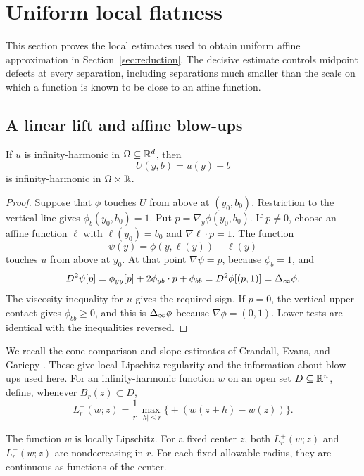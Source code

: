 \section{Uniform local flatness}\label{sec:flatness}

This section proves the local estimates used to obtain uniform affine approximation in Section~\ref{sec:reduction}. The decisive estimate controls midpoint defects at every separation, including separations much smaller than the scale on which a function is known to be close to an affine function.

\subsection{A linear lift and affine blow-ups}

\begin{lemma}\label{lem:linear-lift}
If $u$ is infinity-harmonic in $\Omega\subseteq\mathbb{R}^d$, then
\[
  U(y,b)=u(y)+b
\]
is infinity-harmonic in $\Omega\times\mathbb{R}$.
\end{lemma}

\begin{proof}
Suppose that $\phi$ touches $U$ from above at $(y_0,b_0)$. Restriction to the vertical line gives $\phi_b(y_0,b_0)=1$. Put $p=\nabla_y\phi(y_0,b_0)$. If $p\ne0$, choose an affine function $\ell$ with $\ell(y_0)=b_0$ and $\nabla\ell\cdot p=1$. The function
\[
  \psi(y)=\phi(y,\ell(y))-\ell(y)
\]
touches $u$ from above at $y_0$. At that point $\nabla\psi=p$, because $\phi_b=1$, and
\[
  D^2\psi[p]
  =\phi_{yy}[p]+2\phi_{yb}\cdot p+\phi_{bb}
  =D^2\phi[(p,1)]=\Delta_{\infty}\phi.
\]
The viscosity inequality for $u$ gives the required sign. If $p=0$, the vertical upper contact gives $\phi_{bb}\ge0$, and this is $\Delta_{\infty}\phi$ because $\nabla\phi=(0,1)$. Lower tests are identical with the inequalities reversed.
\end{proof}

We recall the cone comparison and slope estimates of Crandall, Evans, and Gariepy \cite{CrandallEvansGariepy2001}. These give local Lipschitz regularity and the information about blow-ups used here. For an infinity-harmonic function $w$ on an open set $D\subseteq\mathbb{R}^n$, define, whenever $\overline B_r(z)\subset D$,
\[
  L_r^\pm(w;z)=\frac1r\max_{|h|\le r}\bigl\{\pm(w(z+h)-w(z))\bigr\}.
\]

\begin{lemma}\label{lem:cone-slopes}
The function $w$ is locally Lipschitz. For a fixed center $z$, both $L_r^+(w;z)$ and $L_r^-(w;z)$ are nondecreasing in $r$. For each fixed allowable radius, they are continuous as functions of the center.
\end{lemma}


